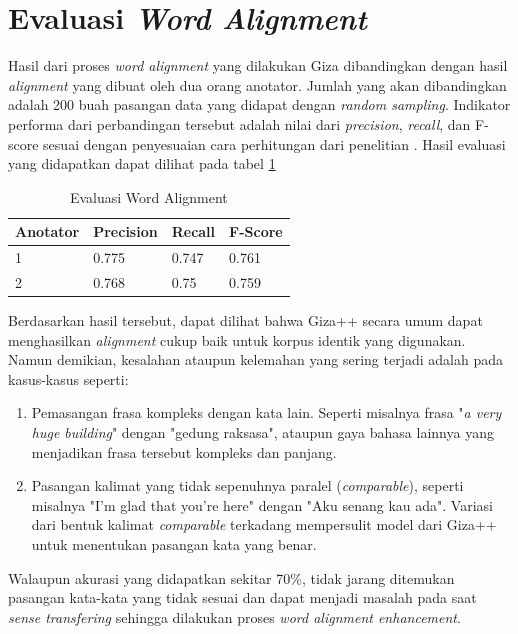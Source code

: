 \section{Evaluasi \textit{Word Alignment}}

Hasil dari proses \textit{word alignment} yang dilakukan Giza dibandingkan dengan hasil \textit{alignment} yang dibuat oleh dua orang anotator. Jumlah yang akan dibandingkan adalah 200 buah pasangan data yang didapat dengan \textit{random sampling}. Indikator performa dari perbandingan tersebut adalah nilai dari \textit{precision}, \textit{recall}, dan F-score sesuai dengan penyesuaian cara perhitungan dari penelitian \citep{mihalcea2003evaluation}. Hasil evaluasi yang didapatkan dapat dilihat pada tabel \ref{table:word-alignment-evaluation}

\begin{table}
	\centering
	\caption{Evaluasi Word Alignment}
	\label{table:word-alignment-evaluation}
	\begin{tabular}{|p{2cm}|p{2cm}|p{2cm}|p{2cm}|}
		\hline
		Anotator & Precision & Recall & F-Score
		\\ \hline
		1 & 0.775 & 0.747 & 0.761
		\\ \hline
		2 & 0.768 & 0.75 & 0.759
		\\ \hline
	\end{tabular} 
\end{table}

Berdasarkan hasil tersebut, dapat dilihat bahwa Giza++ secara umum dapat menghasilkan \textit{alignment} cukup baik untuk korpus identik yang digunakan. Namun demikian, kesalahan ataupun kelemahan yang sering terjadi adalah pada kasus-kasus seperti:

\begin{enumerate}
	\item Pemasangan frasa kompleks dengan kata lain. Seperti misalnya frasa "\textit{a very huge building}" dengan "gedung raksasa", ataupun gaya bahasa lainnya yang menjadikan frasa tersebut kompleks dan panjang.
	\item Pasangan kalimat yang tidak sepenuhnya paralel (\textit{comparable}), seperti misalnya "I'm glad that you're here" dengan "Aku senang kau ada". Variasi dari bentuk kalimat \textit{comparable} terkadang mempersulit model dari Giza++ untuk menentukan pasangan kata yang benar.
\end{enumerate}

Walaupun akurasi yang didapatkan sekitar 70\%, tidak jarang ditemukan pasangan kata-kata yang tidak sesuai dan dapat menjadi masalah pada saat \textit{sense transfering} sehingga dilakukan proses \textit{word alignment enhancement}.


